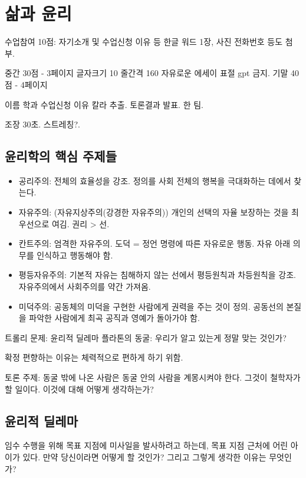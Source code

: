 \chapter{삶과 윤리}

수업참여 10점: 자기소개 및 수업신청 이유 등
한글 워드 1장, 사진 전화번호 등도 첨부.

중간 30점 - 3페이지 글자크기 10 줄간격 160 자유로운 에세이 표절 gpt 금지.
기말 40점 - 4페이지

이름 학과 수업신청 이유 칼라 추출.
토론결과 발표. 한 팀.

조장 30초. 스트레칭?.

\section{윤리학의 핵심 주제들}

\begin{itemize}
  \item 공리주의: 전체의 효율성을 강조. 정의를 사회 전체의 행복을 극대화하는
        데에서 찾는다.
  \item 자유주의: (자유지상주의(강경한 자유주의)) 개인의 선택의 자율 보장하는
        것을 최우선으로 여김. 권리 > 선.
  \item 칸트주의: 엄격한 자유주의. 도덕 = 정언 명령에 따른 자유로운 행동. 자유
        아래 의무를 인식하고 행동해야 함.
  \item 평등자유주의: 기본적 자유는 침해하지 않는 선에서 평등원칙과 차등원칙을 강조.
        자유주의에서 사회주의를 약간 가져옴.
  \item 미덕주의: 공동체의 미덕을 구현한 사람에게 권력을 주는 것이 정의.
        공동선의 본질을 파악한 사람에게 최곡 공직과 영예가 돌아가야 함.
\end{itemize}

트롤리 문제: 윤리적 딜레마
플라톤의 동굴: 우리가 알고 있는게 정말 맞는 것인가?

확정 편향하는 이유는 체력적으로 편하게 하기 위함.

토론 주제: 동굴 밖에 나온 사람은 동굴 안의 사람을 계몽시켜야 한다. 그것이 철학자가 할 일이다.
이것에 대해 어떻게 생각하는가?

\section{윤리적 딜레마}

\begin{exercise}
  임수 수행을 위해 목표 지점에 미사일을 발사하려고 하는데, 목표 지점 근처에 어린
  아이가 있다. 만약 당신이라면 어떻게 할 것인가? 그리고 그렇게 생각한 이유는
  무엇인가?
\end{exercise}

